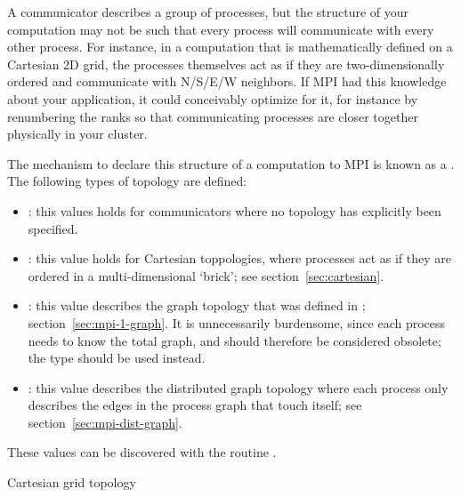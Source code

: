 
A communicator describes a group of processes, but the structure of
your computation may not be such that every process will communicate
with every other process. For instance, in a computation that is
mathematically defined on a
Cartesian 2D grid, the
processes themselves act as if they are two-dimensionally ordered and communicate
with N/S/E/W neighbors. If MPI had this knowledge about your
application, it could conceivably optimize for it, for instance by
renumbering the ranks so that communicating processes are closer
together physically in your cluster.

The mechanism to declare this structure of a computation to MPI
is known as a . The following types of
topology are defined:
\begin{itemize}
\item {}: this values holds for communicators where no
  topology has explicitly been specified.
\item {}: this value holds for Cartesian
  toppologies, where processes act as if they are ordered in a
  multi-dimensional `brick'; see
  section~\ref{sec:cartesian}.
\item {}: this value describes the graph
  topology that was defined in ;
  section~\ref{sec:mpi-1-graph}. It is unnecessarily burdensome, since
  each process needs to know the total graph, and should therefore be
  considered obsolete; the type  should
  be used instead.
\item {}: this value describes the distributed graph
  topology where each process only describes the edges in the process
  graph that touch itself; see section~\ref{sec:mpi-dist-graph}.
\end{itemize}
These values can be discovered with the routine
.

 {Cartesian grid topology}
\label{sec:cartesian}

